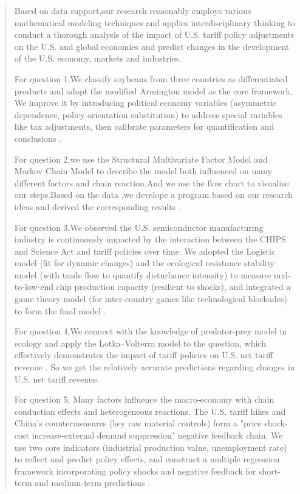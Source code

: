 \documentclass{apmcmthesis}
\begin{document}
\pagestyle{frontmatterstyle}

\begin{abstract}
Based on data support,our research reasonably employs various mathematical modeling techniques and applies interdisciplinary thinking to conduct a thorough analysis of the impact of U.S. tariff policy adjustments on the U.S. and global economies and predict changes in the development of the U.S. economy, markets and industries.

For question 1,We classify soybeans from three countries as differentiated products and adopt the modified Armington model as the core framework. We improve it by introducing political economy variables (asymmetric dependence, policy orientation substitution) to address special variables like tax adjustments, then calibrate parameters for quantification and conclusions \cite{usda2025oilseeds, fao2025stat}.

For question 2,we use the Structural Multivariate Factor Model and Markov Chain Model to describe the model both influenced on many different factors and chain reaction.And we use the flow chart to visualize our steps.Based on the data ,we  develope a program based on our research ideas and derived the corresponding results \cite{jama2025statistics}.

For question 3,We observed the U.S. semiconductor manufacturing industry is continuously impacted by the interaction between the CHIPS and Science Act and tariff policies over time. We adopted the Logistic model (fit for dynamic changes) and the ecological resistance stability model (with trade flow to quantify disturbance intensity) to measure mid-to-low-end chip production capacity (resilient to shocks), and integrated a game theory model (for inter-country games like technological blockades) to form the final model \cite{semiconductors2025state}.

For question 4,We connect with the knowledge of predator-prey model in ecology and apply the Lotka–Volterra model to the question, which effectively demonstrates the impact of tariff policies on U.S. net tariff revenue \cite{ustreasury2025fiscal}. So we get the relatively accurate predictions regarding changes in U.S. net tariff revenue.

For question 5, Many factors influence the macro-economy with chain conduction effects and heterogeneous reactions. The U.S. tariff hikes and China's countermeasures (key raw material controls) form a "price shock-cost increase-external demand suppression" negative feedback chain. We use two core indicators (industrial production value, unemployment rate) to reflect and predict policy effects, and construct a multiple regression framework incorporating policy shocks and negative feedback for short-term and medium-term predictions \cite{imf2025weo}.





\end{abstract}
\end{document}
